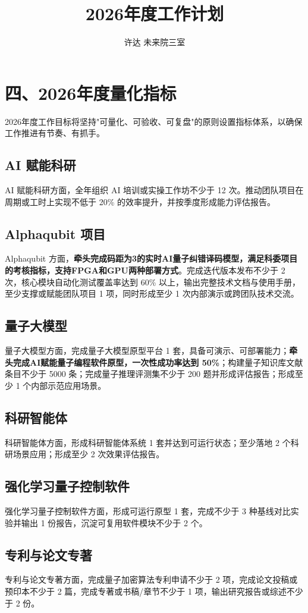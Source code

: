 ﻿\documentclass[12pt,a4paper]{article}
\title{\textbf{2026年度工作计划}}
\author{许达 \quad 未来院三室}
\date{}
\begin{document}
\maketitle

\section*{四、2026年度量化指标}

2026年度工作目标将坚持"可量化、可验收、可复盘"的原则设置指标体系，以确保工作推进有节奏、有抓手。

\subsection*{AI 赋能科研}
AI 赋能科研方面，全年组织 AI 培训或实操工作坊不少于 12 次。推动团队项目在周期或工时上实现不低于 20\% 的效率提升，并按季度形成能力评估报告。

\subsection*{Alphaqubit 项目}
Alphaqubit 方面，\textbf{牵头完成码距为3的实时AI量子纠错译码模型，满足科委项目的考核指标，支持FPGA和GPU两种部署方式}。完成迭代版本发布不少于 2 次，核心模块自动化测试覆盖率达到 60\% 以上，输出完整技术文档与使用手册，至少支撑或赋能团队项目 1 项，同时形成至少 1 次内部演示或跨团队技术交流。

\subsection*{量子大模型}
量子大模型方面，完成量子大模型原型平台 1 套，具备可演示、可部署能力；\textbf{牵头完成AI赋能量子编程软件原型，一次性成功率达到 50\%}；构建量子知识库文献条目不少于 5000 条；完成量子推理评测集不少于 200 题并形成评估报告；形成至少 1 个内部示范应用场景。

\subsection*{科研智能体}
科研智能体方面，形成科研智能体系统 1 套并达到可运行状态；至少落地 2 个科研场景应用；形成至少 2 次效果评估报告。

\subsection*{强化学习量子控制软件}
强化学习量子控制软件方面，形成可运行原型 1 套，完成不少于 3 种基线对比实验并输出 1 份报告，沉淀可复用软件模块不少于 2 个。

\subsection*{专利与论文专著}
专利与论文专著方面，完成量子加密算法专利申请不少于 2 项，完成论文投稿或预印本不少于 2 篇，完成专著或书稿/章节不少于 1 项，输出研究报告或综述不少于 2 份。
\end{document}
